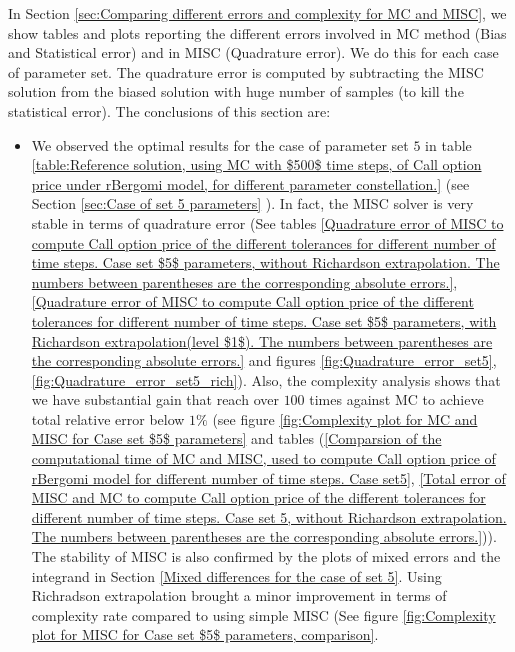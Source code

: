\documentclass[11pt]{article}
\begin{document}
In Section \ref{sec:Comparing different  errors and complexity for MC and MISC}, we show tables and plots reporting  the different errors involved in MC method (Bias and Statistical error) and in MISC (Quadrature error). We do this for each case of parameter set. The quadrature error is computed by subtracting the MISC solution from the biased solution with huge number of samples (to kill the statistical error). The conclusions of this section are: 

\begin{itemize}
	\item We observed the optimal results for the case of parameter set $5$ in table \ref{table:Reference solution, using MC with $500$ time steps, of Call option price under rBergomi model, for different parameter constellation.} (see Section \ref{sec:Case of set 5 parameters} ). In fact, the MISC solver is very stable in terms of quadrature error (See tables \ref{Quadrature error of MISC to compute Call option price of the different tolerances for different number of time steps. Case  set $5$ parameters, without Richardson extrapolation. The numbers between parentheses are the corresponding absolute errors.}, \ref{Quadrature error of MISC to compute Call option price of the different tolerances for different number of time steps. Case set $5$ parameters, with Richardson extrapolation(level $1$). The numbers between parentheses are the corresponding absolute errors.} and figures \ref{fig:Quadrature_error_set5}, \ref{fig:Quadrature_error_set5_rich}). Also, the complexity analysis shows that we have substantial gain that reach over $100$ times against MC to achieve total relative error below $1\%$ (see figure \ref{fig:Complexity plot for MC and MISC for Case set $5$ parameters} and tables (\ref{Comparsion of the computational time of  MC and MISC, used to compute Call option price of rBergomi model for different number of time steps. Case set5}, \ref{Total error of MISC and MC to compute Call option price of the different tolerances for different number of time steps. Case set 5, without Richardson extrapolation. The numbers between parentheses are the corresponding absolute errors.})). The stability of MISC is also confirmed by the plots of mixed errors and the integrand in Section \ref{Mixed differences for the case of set 5}. Using Richradson extrapolation brought a minor improvement in terms of complexity rate compared to using simple MISC (See figure \ref{fig:Complexity plot for  MISC for Case set $5$ parameters, comparison}.
	

\end{itemize}
\end{document}
